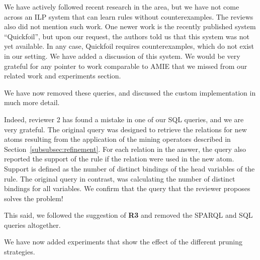 We have actively followed recent research in the area, but we have not come across an ILP system that can learn rules without counterexamples. The reviews also did not mention such work. One newer work is the recently published system ``Quickfoil'', but upon our request, the authors told us that this system was not yet available. In any case, Quickfoil requires counterexamples, which do not exist in our setting. We have added a discussion of this system. We would be very grateful for any pointer to work comparable to AMIE that we missed from our related work and experiments section.


We have now removed these queries, and discussed the custom implementation in much more detail.


	  Indeed, reviewer 2 has found a mistake in one of our SQL queries, and we are very grateful. The original query was designed to retrieve the relations for new atoms resulting from the application of the mining operators described in Section~\ref{subsubsec:refinement}. For each relation in the answer, the query also reported the support of the rule if the relation were used in the new atom. Support is defined as the number of distinct bindings of the head variables of the rule. The original query in contrast, was calculating the number of distinct bindings for all variables. We confirm that the query that the reviewer proposes solves the problem!  

	  This said, we followed the suggestion of \textbf{R3} and removed the SPARQL and SQL queries altogether.


We have now added experiments that show the effect of the different pruning  strategies.


